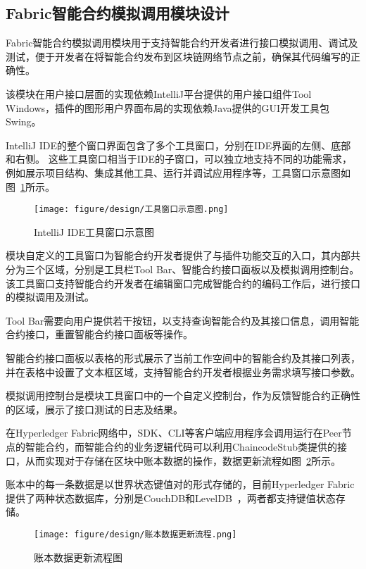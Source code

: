 \subsection{Fabric智能合约模拟调用模块设计}

Fabric智能合约模拟调用模块用于支持智能合约开发者进行接口模拟调用、调试及测试，便于开发者在将智能合约发布到区块链网络节点之前，确保其代码编写的正确性。

该模块在用户接口层面的实现依赖IntelliJ平台提供的用户接口组件Tool Windows，插件的图形用户界面布局的实现依赖Java提供的GUI开发工具包Swing。

IntelliJ IDE的整个窗口界面包含了多个工具窗口，分别在IDE界面的左侧、底部和右侧。
这些工具窗口相当于IDE的子窗口，可以独立地支持不同的功能需求，例如展示项目结构、集成其他工具、运行并调试应用程序等，工具窗口示意图如图~\ref{fig:3.14}所示。

\begin{figure}[htb]
  \centering
  \texttt{[image: figure/design/工具窗口示意图.png]}
  \caption{IntelliJ IDE工具窗口示意图}\label{fig:3.14}
\end{figure}

模块自定义的工具窗口为智能合约开发者提供了与插件功能交互的入口，其内部共分为三个区域，分别是工具栏Tool Bar、智能合约接口面板以及模拟调用控制台。该工具窗口支持智能合约开发者在编辑窗口完成智能合约的编码工作后，进行接口的模拟调用及测试。

Tool Bar需要向用户提供若干按钮，以支持查询智能合约及其接口信息，调用智能合约接口，重置智能合约接口面板等操作。

智能合约接口面板以表格的形式展示了当前工作空间中的智能合约及其接口列表，并在表格中设置了文本框区域，支持智能合约开发者根据业务需求填写接口参数。

模拟调用控制台是模块工具窗口中的一个自定义控制台，作为反馈智能合约正确性的区域，展示了接口测试的日志及结果。

在Hyperledger Fabric网络中，SDK、CLI等客户端应用程序会调用运行在Peer节点的智能合约，而智能合约的业务逻辑代码可以利用ChaincodeStub类提供的接口，从而实现对于存储在区块中账本数据的操作，数据更新流程如图~\ref{fig:3.15}所示。

账本中的每一条数据是以世界状态键值对的形式存储的，目前Hyperledger Fabric提供了两种状态数据库，分别是CouchDB和LevelDB~\cite{DBLP:conf/hpcc/Dyreson16}，两者都支持键值状态存储。

\begin{figure}[htb]
  \centering
  \texttt{[image: figure/design/账本数据更新流程.png]}
  \caption{账本数据更新流程图}\label{fig:3.15}
\end{figure}


